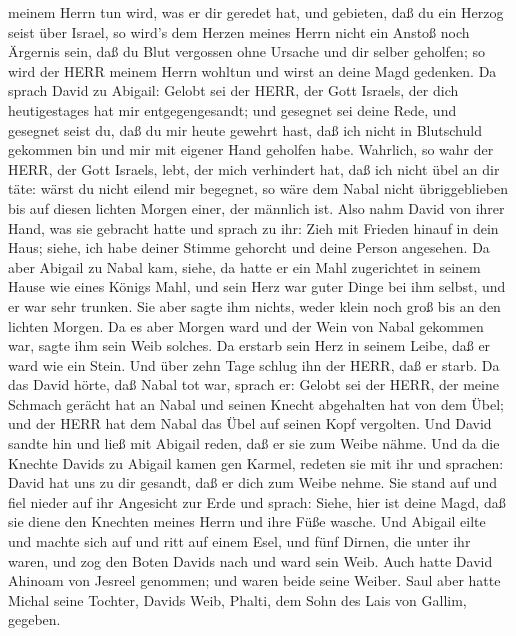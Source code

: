meinem Herrn tun wird, was er dir geredet hat, und gebieten, daß du ein
Herzog seist über Israel,  so wird's dem Herzen meines
Herrn nicht ein Anstoß noch Ärgernis sein, daß du Blut vergossen ohne
Ursache und dir selber geholfen; so wird der HERR meinem Herrn wohltun
und wirst an deine Magd gedenken.  Da sprach David zu
Abigail: Gelobt sei der HERR, der Gott Israels, der dich heutigestages
hat mir entgegengesandt;  und gesegnet sei deine Rede, und
gesegnet seist du, daß du mir heute gewehrt hast, daß ich nicht in
Blutschuld gekommen bin und mir mit eigener Hand geholfen habe.
 Wahrlich, so wahr der HERR, der Gott Israels, lebt, der
mich verhindert hat, daß ich nicht übel an dir täte: wärst du nicht
eilend mir begegnet, so wäre dem Nabal nicht übriggeblieben bis auf
diesen lichten Morgen einer, der männlich ist.  Also nahm
David von ihrer Hand, was sie gebracht hatte und sprach zu ihr: Zieh mit
Frieden hinauf in dein Haus; siehe, ich habe deiner Stimme gehorcht und
deine Person angesehen.  Da aber Abigail zu Nabal kam,
siehe, da hatte er ein Mahl zugerichtet in seinem Hause wie eines Königs
Mahl, und sein Herz war guter Dinge bei ihm selbst, und er war sehr
trunken. Sie aber sagte ihm nichts, weder klein noch groß bis an den
lichten Morgen.  Da es aber Morgen ward und der Wein von
Nabal gekommen war, sagte ihm sein Weib solches. Da erstarb sein Herz in
seinem Leibe, daß er ward wie ein Stein.  Und über zehn
Tage schlug ihn der HERR, daß er starb.  Da das David
hörte, daß Nabal tot war, sprach er: Gelobt sei der HERR, der meine
Schmach gerächt hat an Nabal und seinen Knecht abgehalten hat von dem
Übel; und der HERR hat dem Nabal das Übel auf seinen Kopf vergolten. Und
David sandte hin und ließ mit Abigail reden, daß er sie zum Weibe nähme.
 Und da die Knechte Davids zu Abigail kamen gen Karmel,
redeten sie mit ihr und sprachen: David hat uns zu dir gesandt, daß er
dich zum Weibe nehme.  Sie stand auf und fiel nieder auf
ihr Angesicht zur Erde und sprach: Siehe, hier ist deine Magd, daß sie
diene den Knechten meines Herrn und ihre Füße wasche.  Und
Abigail eilte und machte sich auf und ritt auf einem Esel, und fünf
Dirnen, die unter ihr waren, und zog den Boten Davids nach und ward sein
Weib.  Auch hatte David Ahinoam von Jesreel genommen; und
waren beide seine Weiber.  Saul aber hatte Michal seine
Tochter, Davids Weib, Phalti, dem Sohn des Lais von Gallim, gegeben.

